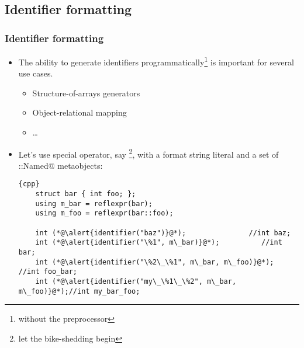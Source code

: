 \documentclass[compress,table,xcolor=table]{beamer}
\begin{document}
\subsection{Identifier formatting}
\begin{frame}[fragile]
\frametitle{Identifier formatting}
  \small
  \begin{itemize}
    \item The ability to generate identifiers programmatically\footnote{without
       the preprocessor} is important for several use cases.
    \begin{itemize}
      \footnotesize
      \item Structure-of-arrays generators
      \item Object-relational mapping
      \item \ldots
    \end{itemize}
    \item Let's use special operator, say \verb@identifier@\footnote{let the
      bike-shedding begin}, with a format string literal
      and a set of \verb@meta::Named@ metaobjects:
      \begin{lstlisting}{cpp}
	struct bar { int foo; };
	using m_bar = reflexpr(bar);
	using m_foo = reflexpr(bar::foo);

	int (*@\alert{identifier("baz")}@*);               //int baz;
	int (*@\alert{identifier("\%1", m\_bar)}@*);          //int bar;
	int (*@\alert{identifier("\%2\_\%1", m\_bar, m\_foo)}@*);  //int foo_bar;
	int (*@\alert{identifier("my\_\%1\_\%2", m\_bar, m\_foo)}@*);//int my_bar_foo;
      \end{lstlisting}
  \end{itemize}
\end{frame}
\end{document}
